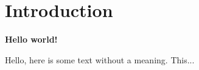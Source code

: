 \documentclass[../main.tex]{subfiles}
\begin{document}
\section{Introduction}
\textbf{Hello world!}
  
Hello, here is some text without a meaning.  This... 
\end{document}
